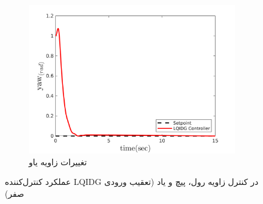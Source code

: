\begin{figure}[H]
	\centering
	\begin{subfigure}[H]
		\centering
		\includegraphics[width=12cm]{../Figures/MIL/LQIDG/3DOF/lqidg_yaw.png}
		\caption{تغییرات زاویه یاو}
	\end{subfigure}
	\caption{‫‪عملکرد کنترل‌کننده LQIDG در کنترل زاویه رول، پیچ و یاد (تعقیب ورودی صفر)}
\end{figure}


